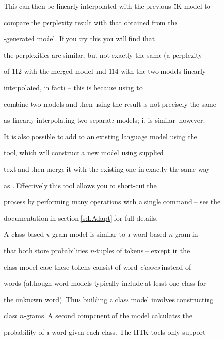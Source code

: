 This can then be linearly interpolated with the previous 5K model to


compare the perplexity result with that obtained from the


-generated model.  If you try this you will find that


the perplexities are similar, but not exactly the same (a perplexity


of 112 with the merged model and 114 with the two models linearly


interpolated, in fact) -- this is because using  to


combine two models and then using the result is not precisely the same


as linearly interpolating two separate models; it is similar, however.





It is also possible to add to an existing language model using the


 tool, which will construct a new model using supplied


text and then merge it with the existing one in exactly the same way


as .  Effectively this tool allows you to short-cut the


process by performing many operations with a single command -- see the


documentation in section \ref{s:LAdapt} for full details.












A class-based $n$-gram model is similar to a word-based $n$-gram in


that both store probabilities $n$-tuples of tokens -- except in the


class model case these tokens consist of word {\it classes} instead of


words (although word models typically include at least one class for


the unknown word).  Thus building a class model involves constructing


class $n$-grams.  A second component of the model calculates the


probability of a word given each class.  The HTK tools only support


